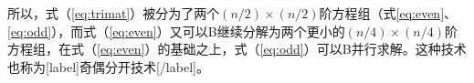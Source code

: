\documentclass[UTF8,nofonts]{ctexart}
\begin{document}
所以，式（\ref{eq:trimat}）被分为了两个$(n/2)\times(n/2)$阶方程组（式\ref{eq:even}、\ref{eq:odd}），而式（\ref{eq:even}）又可以B继续分解为两个更小的$(n/4)\times(n/4)$阶方程组，在式（\ref{eq:even}）的基础之上，式（\ref{eq:odd}）可以B并行求解。这种技术也称为[label]奇偶分开技术[/label]。



\end{document}
